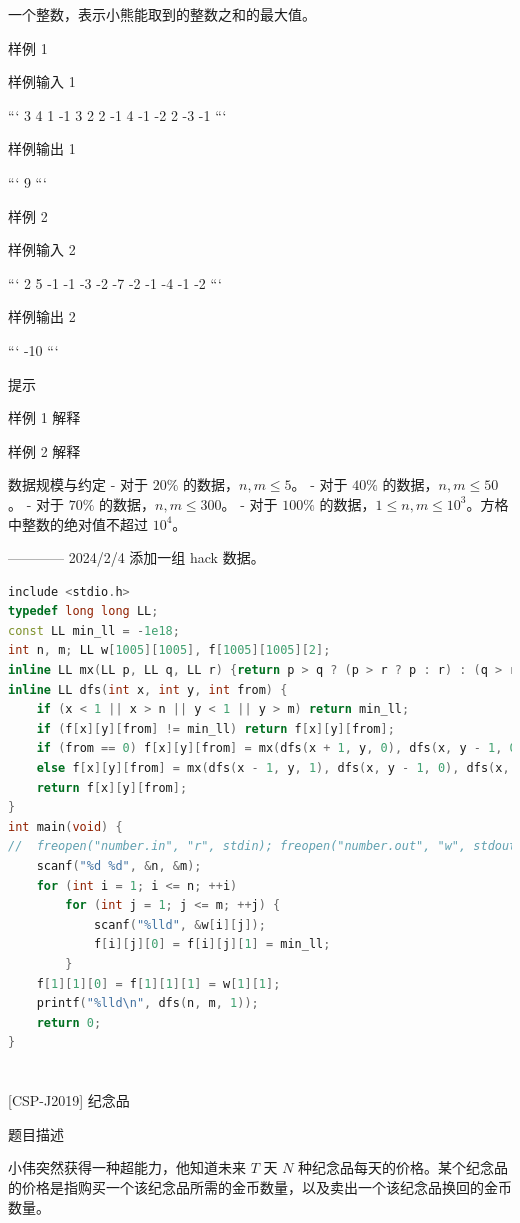 \documentclass[12pt,twiside,a4paper]{ctexbook}
\numberwithin{chapter}{part}
\begin{document}
一个整数，表示小熊能取到的整数之和的最大值。

 样例 1

 样例输入 1

```
3 4
1 -1 3 2
2 -1 4 -1
-2 2 -3 -1
```

 样例输出 1

```
9
```

 样例 2

 样例输入 2

```
2 5
-1 -1 -3 -2 -7
-2 -1 -4 -1 -2
```

 样例输出 2

```
-10
```

 提示

 样例 1 解释

 样例 2 解释

 数据规模与约定
- 对于 $20\%$ 的数据，$n, m \le 5$。
- 对于 $40\%$ 的数据，$n, m \le 50$。
- 对于 $70\%$ 的数据，$n, m \le 300$。
- 对于 $100\%$ 的数据，$1 \le n,m \le 10^3$。方格中整数的绝对值不超过 $10^4$。

------------
2024/2/4 添加一组 hack 数据。
\begin{lstlisting}[language=c++,breaklines=true]
include <stdio.h>
typedef long long LL;
const LL min_ll = -1e18;
int n, m; LL w[1005][1005], f[1005][1005][2];
inline LL mx(LL p, LL q, LL r) {return p > q ? (p > r ? p : r) : (q > r ? q : r);}
inline LL dfs(int x, int y, int from) {
    if (x < 1 || x > n || y < 1 || y > m) return min_ll;
    if (f[x][y][from] != min_ll) return f[x][y][from];
    if (from == 0) f[x][y][from] = mx(dfs(x + 1, y, 0), dfs(x, y - 1, 0), dfs(x, y - 1, 1)) + w[x][y];
    else f[x][y][from] = mx(dfs(x - 1, y, 1), dfs(x, y - 1, 0), dfs(x, y - 1, 1)) + w[x][y];
    return f[x][y][from];
}
int main(void) {
//	freopen("number.in", "r", stdin); freopen("number.out", "w", stdout);
	scanf("%d %d", &n, &m);
	for (int i = 1; i <= n; ++i)
		for (int j = 1; j <= m; ++j) {
			scanf("%lld", &w[i][j]);
			f[i][j][0] = f[i][j][1] = min_ll;
		}
    f[1][1][0] = f[1][1][1] = w[1][1];
	printf("%lld\n", dfs(n, m, 1));
	return 0;
}
\end{lstlisting}

\section{}
 [CSP-J2019] 纪念品

 题目描述

小伟突然获得一种超能力，他知道未来 $T$ 天 $N$ 种纪念品每天的价格。某个纪念品的价格是指购买一个该纪念品所需的金币数量，以及卖出一个该纪念品换回的金币数量。
\end{document}
